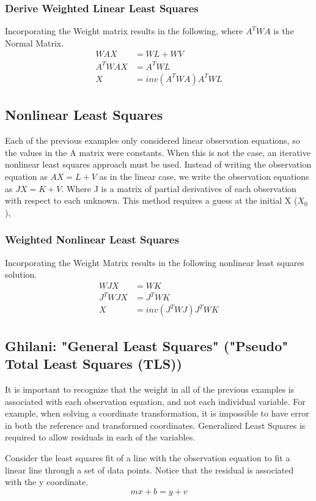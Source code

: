 \subsubsection*{Derive Weighted Linear Least Squares}
Incorporating the Weight matrix results in the following, where $A^TWA$ is the Normal Matrix.
\begin{align*}
WAX &= WL + WV \\
A^TWAX &= A^TWL \\
X &= inv(A^TWA)A^TWL
\end{align*}

\subsection{Nonlinear Least Squares}
Each of the previous examples only considered linear observation equations, so the values in the A matrix were constants.  When this is not the case, an iterative nonlinear least squares approach must be used.  Instead of writing the observation equation as $AX=L+V$ as in the linear case, we write the observation equations as $JX=K+V$. Where J is a matrix of partial derivatives of each observation with respect to each unknown.  This method requires a guess at the initial X ($X_0$), 

\subsubsection*{Weighted Nonlinear Least Squares}
Incorporating the Weight Matrix results in the following nonlinear least squares solution.
\begin{align*}
WJX &= WK \\
J^TWJX &= J^TWK \\
X &= inv(J^TWJ)J^TWK
\end{align*}
\subsection{Ghilani: "General Least Squares" ("Pseudo" Total Least Squares (TLS))}
It is important to recognize that the weight in all of the previous examples is associated with each observation equation, and not each individual variable.  For example, when solving a coordinate transformation, it is impossible to have error in both the reference and transformed coordinates. Generalized Least Squares is required to allow residuals in each of the variables.

Consider the least squares fit of a line with the observation equation to fit a linear line through a set of data points.  Notice that the residual is associated with the y coordinate.
\[
mx+b = y + v
\]

